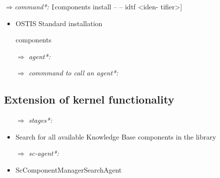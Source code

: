 \documentclass[twocolumn]{article}
\begin{document}
\begin{do}
    \begin{itemize}
$\Rightarrow $\textit {command*:} \hfill\break 
\texttt [components install --  -- idtf <iden- \break
tifier>]
\end{itemize}   
\end{do}   



\begin{itemize}
    \item \qquad OSTIS Standard installation

components
\end{itemize}


  

    \begin{itemize}
\item[$\Rightarrow $]\textit {agent*:} \hfill\break 
[ScComponentManagerInstallAgent]
\end{itemize}   
   

    \begin{itemize}
\item [$\Rightarrow $] \textit {commmand to call an agent*:} \hfill{}
\end{itemize}   







\subsection*{Extension of kernel functionality}

    \begin{itemize}
\item[$\Rightarrow $]\textit {stages*:} \hfill\break 
[ScComponentManagerInstallAgent]
\item {Search for all available Knowledge Base
components in the library}

\item[$\Rightarrow $]\textit {sc-agent*:} \hfill\break 
[ScComponentManagerInstallAgent]
\item {ScComponentManagerSearchAgent}


\end{itemize}   
   
\end{document}
